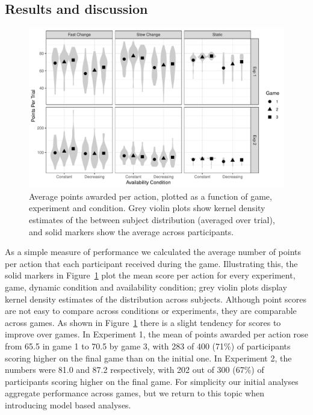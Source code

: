 \documentclass[a4paper,doc,natbib]{apa6}
\begin{document}
\subsection{Results and discussion}


\begin{figure}[t]
\centering
\includegraphics[width=.9\textwidth]{game_points.pdf}
\caption{\small{Average points awarded per action, plotted as a function of game, experiment and condition. Grey violin plots show kernel density estimates of the between subject distribution (averaged over trial), and solid markers show the average across participants.}}
\label{fig:points}
\end{figure}

As a simple measure of performance we calculated the average number of points per action that each participant received during the game. Illustrating this, the solid markers in Figure~\ref{fig:points} plot the mean score per action for every experiment, game, dynamic condition and availability condition; grey violin plots display kernel density estimates of the distribution across  subjects. Although point scores are not easy to compare across conditions or experiments, they are comparable across  games. As shown in Figure~\ref{fig:points} there is a slight tendency for scores to improve over games. In Experiment 1, the mean of points awarded per action rose from 65.5 in game 1 to 70.5 by game 3, with 283 of 400 (71\%) of participants scoring higher on the final game than on the initial one. In Experiment 2, the numbers were 81.0 and 87.2 respectively, with 202 out of 300 (67\%) of participants scoring higher on the final game.
 For simplicity our initial analyses aggregate performance across games, but we return to this topic when introducing model based analyses.
\end{document}
